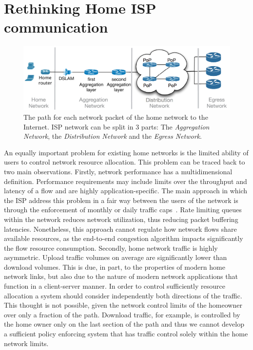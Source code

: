 \section{Rethinking Home ISP communication} \label{s:qos}

\begin{figure}[ht]
  \centering
  \includegraphics[width=0.95\columnwidth]{isp_plan}
  \caption{\label{fig:isp_plan} The path for each network packet of 
    the home network to the Internet. ISP network can be split in 3 parts:
  The {\it Aggregation Network}, the {\it Distribution Network} and the {\it
    Egress Network}.}
\end{figure}

An equally important problem for existing home networks is the limited ability
of users to control network resource allocation. This problem can be traced back
to two main observations. Firstly, network performance has a multidimensional
definition. Performance requirements may include limits over the  throughput and
latency of a flow and are highly application-specific.  The main approach in
which the ISP address this problem in a fair way between the users of the
network is through the enforcement of monthly or daily traffic
caps~\cite{virgin-caps,bt-caps}.  Rate limiting queues within the network
reduces network utilization, thus reducing packet buffering latencies.
Nonetheless, this approach cannot regulate how network flows share available
resources, as the end-to-end congestion algorithm impacts significantly the flow
resource consumption. Secondly, home network traffic is highly asymmetric.
Upload traffic volumes on average are significantly lower than download volumes.
This is due, in part, to the properties of modern home network links, but also
due to the nature of modern network applications that function in a
client-server manner.  In order to control sufficiently resource allocation a
system should consider independently both directions of the traffic. This
thought is not possible, given the network control limits of the homeowner over
only a fraction of the path. Download traffic, for example, is controlled by the
home owner only on the last section of the path and thus we cannot develop a
sufficient policy enforcing system that has traffic control solely within the
home network limits.

